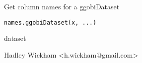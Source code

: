 \begin{Description}\relax
Get column names for a ggobiDataset
\end{Description}
\begin{Usage}
\begin{verbatim}names.ggobiDataset(x, ...)\end{verbatim}
\end{Usage}
\begin{Arguments}
\begin{ldescription}
\item[\code{x}] dataset
\item[\code{...}] 
\end{ldescription}
\end{Arguments}
\begin{Details}\relax
\end{Details}
\begin{Author}\relax
Hadley Wickham <h.wickham@gmail.com>
\end{Author}
\begin{Examples}
\begin{ExampleCode}\end{ExampleCode}
\end{Examples}

